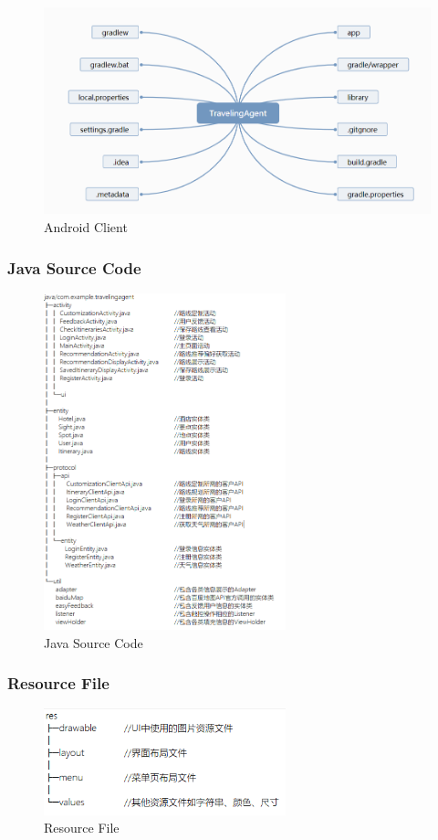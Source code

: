 \documentclass[10pt]{article}
\begin{document}
\begin{figure}[H]
	\centering
	\includegraphics[width=14cm]{android.png}
	\caption{Android Client}
	\label{Android Client}
\end{figure}

\subsubsection{Java Source Code}
\begin{figure}[H]
	\centering
	\includegraphics[width=7cm]{java.png}
	\caption{Java Source Code}
	\label{Java Source Code}
\end{figure}

\subsubsection{Resource File}
\begin{figure}[H]
	\centering
	\includegraphics[width=7cm]{res.png}
	\caption{Resource File}
	\label{Resource File}
\end{figure}
\end{document}
